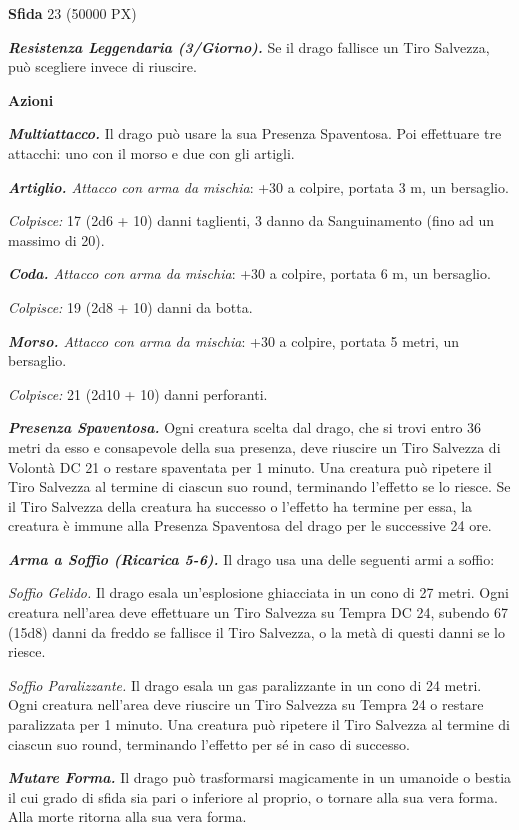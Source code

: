 \begin{multicols}{2}
	\textbf{Sfida} 23 (50000 PX)

	\textit{\textbf{Resistenza Leggendaria (3/Giorno).}} Se il drago fallisce un Tiro Salvezza, può scegliere invece di riuscire.

	\textbf{Azioni}

	\textit{\textbf{Multiattacco.}} Il drago può usare la sua Presenza Spaventosa. Poi effettuare tre attacchi: uno con il morso e due con gli
	artigli.

	\textit{\textbf{Artiglio.} Attacco con arma da mischia}: +30 a colpire, portata 3 m, un bersaglio.

	\textit{Colpisce:} 17 (2d6 + 10) danni taglienti, 3 danno da Sanguinamento (fino ad un massimo di 20).

	\textit{\textbf{Coda.} Attacco con arma da mischia}: +30 a colpire, portata 6 m, un bersaglio.

	\textit{Colpisce:} 19 (2d8 + 10) danni da botta.

	\textit{\textbf{Morso.} Attacco con arma da mischia}: +30 a colpire, portata 5 metri, un bersaglio.

	\textit{Colpisce:} 21 (2d10 + 10) danni perforanti.

	\textit{\textbf{Presenza Spaventosa.}} Ogni creatura scelta dal drago, che si trovi entro 36 metri da esso e consapevole della sua presenza, deve riuscire un Tiro Salvezza di Volontà DC 21 o restare spaventata per 1 minuto. Una creatura può ripetere il Tiro Salvezza al termine di ciascun suo round, terminando l'effetto se lo riesce. Se il Tiro Salvezza della creatura ha successo o l'effetto ha termine per essa, la creatura è immune alla Presenza Spaventosa del drago per le successive 24 ore.

	\textit{\textbf{Arma a Soffio (Ricarica 5-6).}} Il drago usa una delle seguenti armi a soffio:

	\textit{Soffio Gelido.} Il drago esala un'esplosione ghiacciata in un cono di 27 metri. Ogni creatura nell'area deve effettuare un Tiro Salvezza su Tempra DC 24, subendo 67 (15d8) danni da freddo se fallisce il Tiro Salvezza, o la metà di questi danni se lo riesce.

	\textit{Soffio Paralizzante.} Il drago esala un gas paralizzante in un cono di 24 metri. Ogni creatura nell'area deve riuscire un Tiro Salvezza su Tempra 24 o restare paralizzata per 1 minuto. Una creatura può ripetere il Tiro Salvezza al termine di ciascun suo round, terminando l'effetto per sé in caso di successo.

	\textit{\textbf{Mutare Forma.}} Il drago può trasformarsi magicamente in un umanoide o bestia il cui grado di sfida sia pari o inferiore al proprio, o tornare alla sua vera forma. Alla morte ritorna alla sua vera forma.


\end{multicols}
